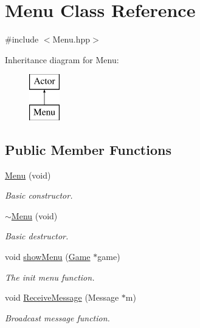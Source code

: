 \hypertarget{class_menu}{\section{Menu Class Reference}
\label{class_menu}
}


{\ttfamily \#include $<$Menu.\+hpp$>$}

Inheritance diagram for Menu\+:\begin{figure}[H]
\begin{center}
\leavevmode
\includegraphics[height=2.000000cm]{class_menu}
\end{center}
\end{figure}
\subsection*{Public Member Functions}
\begin{DoxyCompactItemize}
\item 
\hyperlink{class_menu_a0c1481a62f6b0bf63a506d2622f2244f}{Menu} (void)
\begin{DoxyCompactList}\small\item\em Basic constructor. \end{DoxyCompactList}\item 
\hypertarget{class_menu_a73932d2ddab91e989102211f81c98c76}{\hyperlink{class_menu_a73932d2ddab91e989102211f81c98c76}{$\sim$\+Menu} (void)}\label{class_menu_a73932d2ddab91e989102211f81c98c76}

\begin{DoxyCompactList}\small\item\em Basic destructor. \end{DoxyCompactList}\item 
void \hyperlink{class_menu_a49984eb86ba63299629f3a84876499be}{show\+Menu} (\hyperlink{class_game}{Game} $\ast$game)
\begin{DoxyCompactList}\small\item\em The init menu function. \end{DoxyCompactList}\item 
void \hyperlink{class_menu_ab8cc125a548bd9d0c75ecc222df093e8}{Receive\+Message} (Message $\ast$m)
\begin{DoxyCompactList}\small\item\em Broadcast message function. \end{DoxyCompactList}\end{DoxyCompactItemize}


